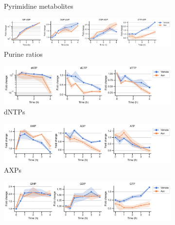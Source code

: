 \begin{figure}[ht!]
\begin{subfigure}[b]{0.63\textwidth}
        \caption{Pyrimidine metabolites}
        \label{fig:app_ch2:HT1080_Anti_pyr}
    \end{subfigure}
    \hfill
    \begin{subfigure}[b]{0.85\textwidth}
        \includegraphics[width=\textwidth]{figures/chap2/app/HT1080_Anti_pur.pdf}
        \caption{Purine ratios}
        \label{fig:app_ch2:HT1080_Anti_pur}
    \end{subfigure}
    \hfill
    \caption{}
\end{figure}

\begin{figure}[ht]
    \ContinuedFloat
    \centering
    \begin{subfigure}[b]{0.63\textwidth}
        \includegraphics[width=\textwidth]{figures/chap2/app/HT1080_Anti_dntps.pdf}
        \caption{dNTPs}
        \label{fig:app_ch2:HT1080_Anti_dntps}
    \end{subfigure}
    \hfill
    \begin{subfigure}[b]{0.63\textwidth}
        \includegraphics[width=\textwidth]{figures/chap2/app/HT1080_Anti_axp.pdf}
        \caption{AXPs}
        \label{fig:app_ch2:HT1080_Anti_axp}
    \end{subfigure}
    \hfill
    \begin{subfigure}[b]{0.63\textwidth}
        \includegraphics[width=\textwidth]{figures/chap2/app/HT1080_Anti_gxp.pdf}

\end{subfigure}
\end{figure}
